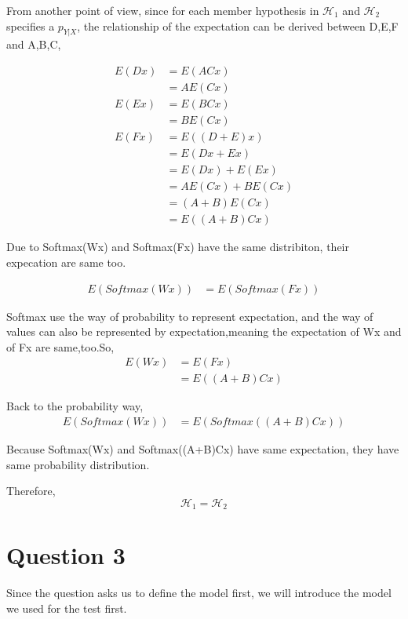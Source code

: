 \documentclass[12pt,letterpaper]{article}
\begin{document}
From another point of view, since for each member hypothesis in $\mathcal{H}_1$ and $\mathcal{H}_2$ specifies a $p_{Y|X}$, the relationship of the expectation can be derived between D,E,F and A,B,C,

\begin{align*}
    E(Dx) &= E(ACx) \\
        &= AE(Cx) \\
    E(Ex) &= E(BCx) \\
        &= BE(Cx) \\
    E(Fx) &= E((D+E)x) \\
        &= E(Dx + Ex) \\
        &= E(Dx) + E(Ex) \\
        &= AE(Cx) + BE(Cx) \\
        &= (A+B)E(Cx) \\
        &= E((A+B)Cx)
\end{align*}

Due to Softmax(Wx) and Softmax(Fx) have the same distribiton, their expecation are same too.

\begin{align*}
    E(Softmax(Wx)) &= E(Softmax(Fx))
\end{align*}

Softmax use the way of probability to represent expectation, and the way of values can also be represented by expectation,meaning the expectation of Wx and of Fx are same,too.So,
\begin{align*}
    E(Wx) &= E(Fx) \\
        &= E((A+B)Cx)
\end{align*}

Back to the probability way,
\begin{align*}
    E(Softmax(Wx)) &= E(Softmax((A+B)Cx))
\end{align*}

Because Softmax(Wx) and Softmax((A+B)Cx) have same expectation, they have same probability distribution.

Therefore,
\begin{equation*}
    \mathcal{H}_1 = \mathcal{H}_2
\end{equation*}

\newpage
\section{Question 3}

Since the question asks us to define the model first, we will introduce the model we used for the test first.
\end{document}
